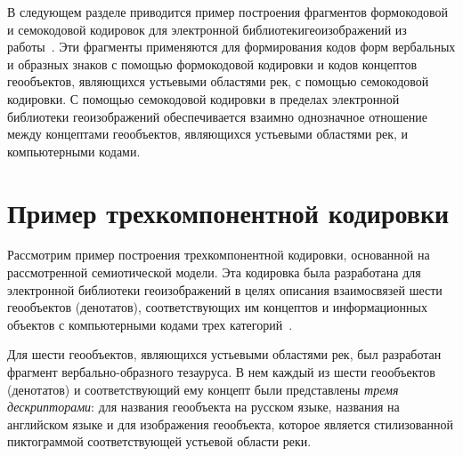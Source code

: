 \begin{multicols}{2}
   В следующем разделе приводится пример построения фрагментов формокодовой и 
семо\-ко\-довой кодировок для электронной библиотеки\linebreak геоизображений из 
работы~\cite{38zat}. Эти фрагменты 
 применяются для формирования кодов форм 
вербальных и образных знаков с помощью формокодовой кодировки и кодов концептов 
геообъектов, являющихся устьевыми областями рек, с помощью семокодовой кодировки. С 
помощью семокодовой кодировки в пределах электронной библиотеки геоизображений 
обеспечивается взаимно однозначное отношение между концептами геообъектов, 
явля\-ющих\-ся устьевыми областями рек, и компьютерными кодами.

\section{Пример трехкомпонентной кодировки}

   Рассмотрим пример построения трехкомпонентной кодировки, основанной на 
рассмотренной семиотической модели. Эта кодировка была разработана для электронной 
библиотеки гео\-изоб\-ра\-же\-ний в целях описания взаимосвязей шести геообъектов (денотатов), 
соответствующих им концептов и информационных объектов с компьютерными кодами трех 
категорий~\cite{38zat}.
   
   Для шести геообъектов, являющихся устьевыми областями рек, был разработан фрагмент 
вербально-образного тезауруса. В нем каждый из шести геообъектов (денотатов) и 
соответствующий ему концепт были представлены \textit{тремя дескрипторами}: для 
названия геообъекта на русском языке, названия на английском языке и для изображения 
геообъекта, которое является стилизованной пиктограммой соответствующей устьевой 
области реки.
   

\end{multicols}
